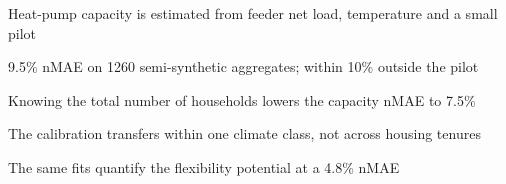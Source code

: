 \item Heat-pump capacity is estimated from feeder net load, temperature and a small pilot
\item 9.5\% nMAE on 1260 semi-synthetic aggregates; within 10\% outside the pilot
\item Knowing the total number of households lowers the capacity nMAE to 7.5\%
\item The calibration transfers within one climate class, not across housing tenures
\item The same fits quantify the flexibility potential at a 4.8\% nMAE
